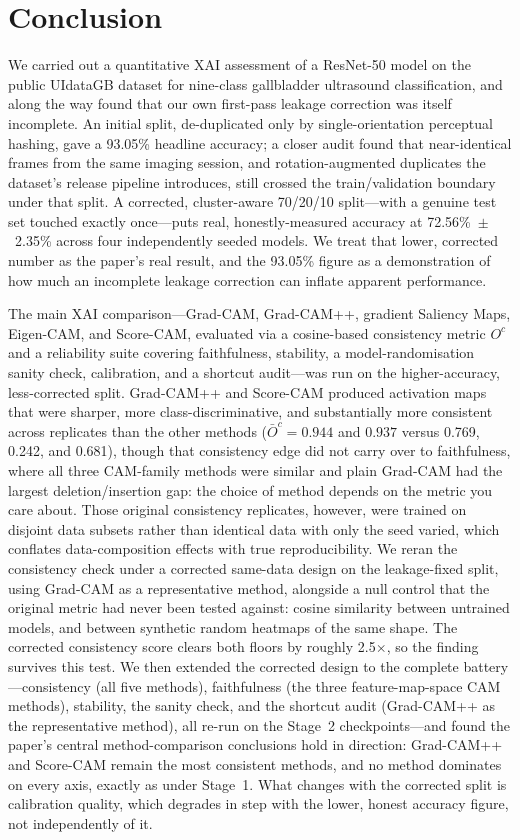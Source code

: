 \section{Conclusion}

We carried out a quantitative XAI assessment of a ResNet-50 model on the public UIdataGB dataset for nine-class gallbladder ultrasound classification, and along the way found that our own first-pass leakage correction was itself incomplete. An initial split, de-duplicated only by single-orientation perceptual hashing, gave a 93.05\% headline accuracy; a closer audit found that near-identical frames from the same imaging session, and rotation-augmented duplicates the dataset's release pipeline introduces, still crossed the train/validation boundary under that split. A corrected, cluster-aware 70/20/10 split---with a genuine test set touched exactly once---puts real, honestly-measured accuracy at 72.56\%~$\pm$~2.35\% across four independently seeded models. We treat that lower, corrected number as the paper's real result, and the 93.05\% figure as a demonstration of how much an incomplete leakage correction can inflate apparent performance.

The main XAI comparison---Grad-CAM, Grad-CAM++, gradient Saliency Maps, Eigen-CAM, and Score-CAM, evaluated via a cosine-based consistency metric $O^c$ and a reliability suite covering faithfulness, stability, a model-randomisation sanity check, calibration, and a shortcut audit---was run on the higher-accuracy, less-corrected split. Grad-CAM++ and Score-CAM produced activation maps that were sharper, more class-discriminative, and substantially more consistent across replicates than the other methods ($\bar{O}^c=0.944$ and $0.937$ versus 0.769, 0.242, and 0.681), though that consistency edge did not carry over to faithfulness, where all three CAM-family methods were similar and plain Grad-CAM had the largest deletion/insertion gap: the choice of method depends on the metric you care about. Those original consistency replicates, however, were trained on disjoint data subsets rather than identical data with only the seed varied, which conflates data-composition effects with true reproducibility. We reran the consistency check under a corrected same-data design on the leakage-fixed split, using Grad-CAM as a representative method, alongside a null control that the original metric had never been tested against: cosine similarity between untrained models, and between synthetic random heatmaps of the same shape. The corrected consistency score clears both floors by roughly 2.5$\times$, so the finding survives this test. We then extended the corrected design to the complete battery---consistency (all five methods), faithfulness (the three feature-map-space CAM methods), stability, the sanity check, and the shortcut audit (Grad-CAM++ as the representative method), all re-run on the Stage~2 checkpoints---and found the paper's central method-comparison conclusions hold in direction: Grad-CAM++ and Score-CAM remain the most consistent methods, and no method dominates on every axis, exactly as under Stage~1. What changes with the corrected split is calibration quality, which degrades in step with the lower, honest accuracy figure, not independently of it.

